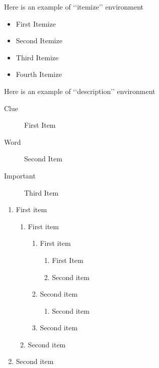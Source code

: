\documentclass[12pt,a4paper]{article}
\begin{document}
	Here is an example of ‘‘itemize’’ environment
	\begin{itemize}
		\item First Itemize
		\item Second Itemize
		\item Third Itemize
		\item Fourth Itemize
	\end{itemize}
	Here is an example of ‘‘description’’ environment
	\begin{description}
		\item[Clue] First Item
		\item[Word] Second Item
		\item[Important] Third Item 
	\end{description}
	
	\begin{enumerate}
		\item First item
		\begin{enumerate}
			\item First item
			\begin{enumerate}
				\item First item
				\begin{enumerate}
					\item First Item
					\item Second item
				\end{enumerate}
				\item Second item
			\begin{enumerate}
				\item Second item
			\end{enumerate}
			\item Second item
			\end{enumerate}
		\item Second item
		\end{enumerate}
	\item Second item
	\end{enumerate}
\end{document}
